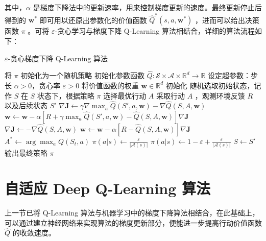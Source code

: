 其中，$\alpha$ 是梯度下降法中的更新速率，用来控制梯度更新的速度。最终更新停止后得到的 $\boldsymbol{w}^*$ 即可用以还原出参数化的价值函数 $\widehat{Q}^*(s,a,\boldsymbol{w}^*)$ ，进而可以给出决策函数 $\pi$ 。可将 $\varepsilon$-贪心学习与梯度下降 Q-Learning 算法相结合，详细的算法流程如下：

\begin{algorithm}[H]
    \caption{$\varepsilon$-贪心梯度下降 Q-Learning 算法}
    \begin{algorithmic}[1] %
        \State 将 $\pi$ 初始化为一个随机策略
        \State 初始化参数函数 $\widehat{Q} : \mathcal{S} \times \mathcal{A} \times \mathbb{R}^{d} \rightarrow \mathbb{R}$
        \State 设定超参数：步长 $\alpha>0$，贪心率 $\varepsilon>0$
        \State 将价值函数的权重 $\boldsymbol{w}\in\mathbb{R}^d$ 初始化
        \Loop
        \State 随机选取初始状态，记作 $S$
        \Repeat
        \State 在 $S$ 状态下，根据策略 $\pi$ 选择最优行动 $A$
        \State 采取行动 $A$ ，观测环境反馈 $R$ 以及后续状态 $S'$
        \State $\nabla\boldsymbol{J}\leftarrow \gamma\nabla\max_a\widehat{Q}(S',a,\boldsymbol{w})-\nabla\widehat{Q}(S,A,\boldsymbol{w})$
        \State $\boldsymbol{w}\leftarrow\boldsymbol{w} - \alpha\left[R+\gamma\max_a\widehat{Q}(S',a,\boldsymbol{w})-\widehat{Q}(S,A,\boldsymbol{w})\right]\nabla\boldsymbol{J}$
        \Else
        \State $\nabla\boldsymbol{J}\leftarrow -\nabla\widehat{Q}(S,A,\boldsymbol{w})$
        \State $\boldsymbol{w}\leftarrow\boldsymbol{w} - \alpha\left[R-\widehat{Q}(S,A,\boldsymbol{w})\right]\nabla\boldsymbol{J}$
        \EndIf
        \State $A^*\leftarrow\arg\max_aQ(S_t,a)$
        \State $\pi(a|s)\leftarrow \frac{\varepsilon}{|\mathcal A(s)|}$
        \Else
        \State $\pi(a|s)\leftarrow 1-\varepsilon+\frac{\varepsilon}{|\mathcal A(s)|}$
        \EndIf
        \EndFor
        \State $S\leftarrow S'$
        \EndLoop
        \State
        \State 输出最终策略 $\pi$
    \end{algorithmic}
\end{algorithm}

\section{自适应 Deep Q-Learning 算法}

上一节已将 Q-Learning 算法与机器学习中的梯度下降算法相结合，在此基础上，可以通过建立神经网络来实现算法的梯度更新部分\cite{hecht1992theory}，便能进一步提高行动价值函数 $\widehat{Q}$ 的收敛速度。

